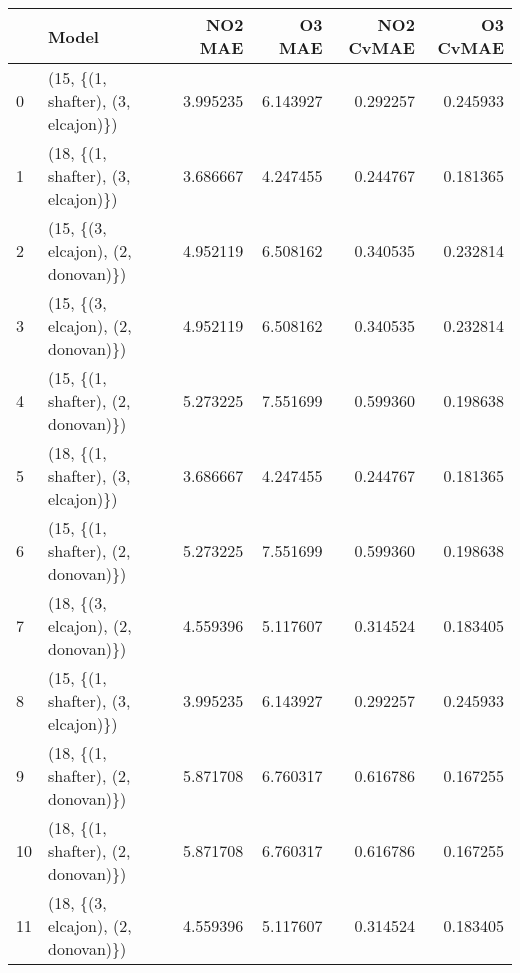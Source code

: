 \begin{tabular}{llrrrr}
\toprule
{} &                               Model &   NO2 MAE &    O3 MAE &  NO2 CvMAE &  O3 CvMAE \\
\midrule
0  &  (15, \{(1, shafter), (3, elcajon)\}) &  3.995235 &  6.143927 &   0.292257 &  0.245933 \\
1  &  (18, \{(1, shafter), (3, elcajon)\}) &  3.686667 &  4.247455 &   0.244767 &  0.181365 \\
2  &  (15, \{(3, elcajon), (2, donovan)\}) &  4.952119 &  6.508162 &   0.340535 &  0.232814 \\
3  &  (15, \{(3, elcajon), (2, donovan)\}) &  4.952119 &  6.508162 &   0.340535 &  0.232814 \\
4  &  (15, \{(1, shafter), (2, donovan)\}) &  5.273225 &  7.551699 &   0.599360 &  0.198638 \\
5  &  (18, \{(1, shafter), (3, elcajon)\}) &  3.686667 &  4.247455 &   0.244767 &  0.181365 \\
6  &  (15, \{(1, shafter), (2, donovan)\}) &  5.273225 &  7.551699 &   0.599360 &  0.198638 \\
7  &  (18, \{(3, elcajon), (2, donovan)\}) &  4.559396 &  5.117607 &   0.314524 &  0.183405 \\
8  &  (15, \{(1, shafter), (3, elcajon)\}) &  3.995235 &  6.143927 &   0.292257 &  0.245933 \\
9  &  (18, \{(1, shafter), (2, donovan)\}) &  5.871708 &  6.760317 &   0.616786 &  0.167255 \\
10 &  (18, \{(1, shafter), (2, donovan)\}) &  5.871708 &  6.760317 &   0.616786 &  0.167255 \\
11 &  (18, \{(3, elcajon), (2, donovan)\}) &  4.559396 &  5.117607 &   0.314524 &  0.183405 \\
\bottomrule
\end{tabular}
